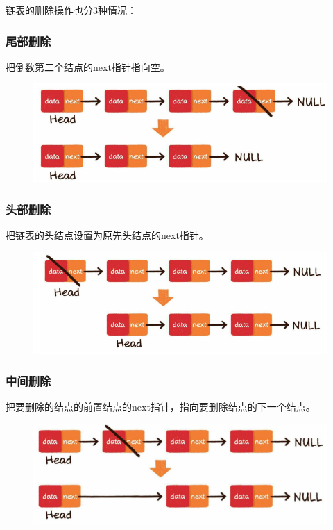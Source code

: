 链表的删除操作也分3种情况：

\subsubsection{尾部删除}

把倒数第二个结点的next指针指向空。

\begin{figure}[H]
	\centering
	\includegraphics[scale=0.8]{img/C3/3-2/1.png}
\end{figure}

\subsubsection{头部删除}

把链表的头结点设置为原先头结点的next指针。

\begin{figure}[H]
	\centering
	\includegraphics[scale=0.8]{img/C3/3-2/2.png}
\end{figure}

\subsubsection{中间删除}

把要删除的结点的前置结点的next指针，指向要删除结点的下一个结点。

\begin{figure}[H]
	\centering
	\includegraphics[scale=0.5]{img/C3/3-2/3.png}
\end{figure}

